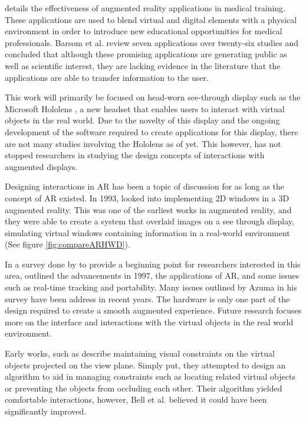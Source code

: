 \cite{Barsom2016} details the effectiveness of augmented reality applications in medical training. These applications are used to blend virtual and digital elements with a physical environment in order to introduce new educational opportunities for medical professionals. Barsom et al. review seven applications over twenty-six studies and concluded that although these promising applications are generating public as well as scientific interest, they are lacking evidence in the literature that the applications are able to transfer information to the user.

This work will primarily be focused on head-worn see-through display such as the Microsoft Hololens \cite{Hololens}, a new headset that enables users to interact with virtual objects in the real world. Due to the novelty of this display and the ongoing development of the software required to create applications for this display, there are not many studies involving the Hololens as of yet. This however, has not stopped researchers in studying the design concepts of interactions with augmented displays. 

Designing interactions in AR has been a topic of discussion for as long as the concept of AR existed. In 1993, \cite{Feiner1993} looked into implementing 2D windows in a 3D augmented reality. This was one of the earliest works in augmented reality, and they were able to create a system that overlaid images on a see through display, simulating virtual windows containing information in a real-world environment (See figure \ref{fig:compareARHWD}). 

In a survey done by \cite{Azuma1997} to provide a beginning point for researchers interested in this area, outlined the advancements in 1997, the applications of AR, and some issues such as real-time tracking and portability. Many issues outlined by Azuma in his survey have been address in recent years. The hardware is only one part of the design required to create a smooth augmented experience. Future research focuses more on the interface and interactions with the virtual objects in the real world environment.

Early works, such as \cite{Bell2001} describe maintaining visual constraints on the virtual objects projected on the view plane. Simply put, they attempted to design an algorithm to aid in managing constraints such as locating related virtual objects or preventing the objects from occluding each other. Their algorithm yielded comfortable interactions, however, Bell et al. believed it could have been significantly improved. 

